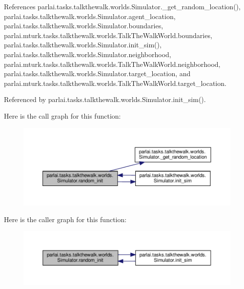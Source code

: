 References parlai.\+tasks.\+talkthewalk.\+worlds.\+Simulator.\+\_\+get\+\_\+random\+\_\+location(), parlai.\+tasks.\+talkthewalk.\+worlds.\+Simulator.\+agent\+\_\+location, parlai.\+tasks.\+talkthewalk.\+worlds.\+Simulator.\+boundaries, parlai.\+mturk.\+tasks.\+talkthewalk.\+worlds.\+Talk\+The\+Walk\+World.\+boundaries, parlai.\+tasks.\+talkthewalk.\+worlds.\+Simulator.\+init\+\_\+sim(), parlai.\+tasks.\+talkthewalk.\+worlds.\+Simulator.\+neighborhood, parlai.\+mturk.\+tasks.\+talkthewalk.\+worlds.\+Talk\+The\+Walk\+World.\+neighborhood, parlai.\+tasks.\+talkthewalk.\+worlds.\+Simulator.\+target\+\_\+location, and parlai.\+mturk.\+tasks.\+talkthewalk.\+worlds.\+Talk\+The\+Walk\+World.\+target\+\_\+location.



Referenced by parlai.\+tasks.\+talkthewalk.\+worlds.\+Simulator.\+init\+\_\+sim().

Here is the call graph for this function\+:
\nopagebreak
\begin{figure}[H]
\begin{center}
\leavevmode
\includegraphics[width=350pt]{classparlai_1_1tasks_1_1talkthewalk_1_1worlds_1_1Simulator_adde735badb8bd967efbc8e6a71378bac_cgraph}
\end{center}
\end{figure}
Here is the caller graph for this function\+:
\nopagebreak
\begin{figure}[H]
\begin{center}
\leavevmode
\includegraphics[width=350pt]{classparlai_1_1tasks_1_1talkthewalk_1_1worlds_1_1Simulator_adde735badb8bd967efbc8e6a71378bac_icgraph}
\end{center}
\end{figure}


